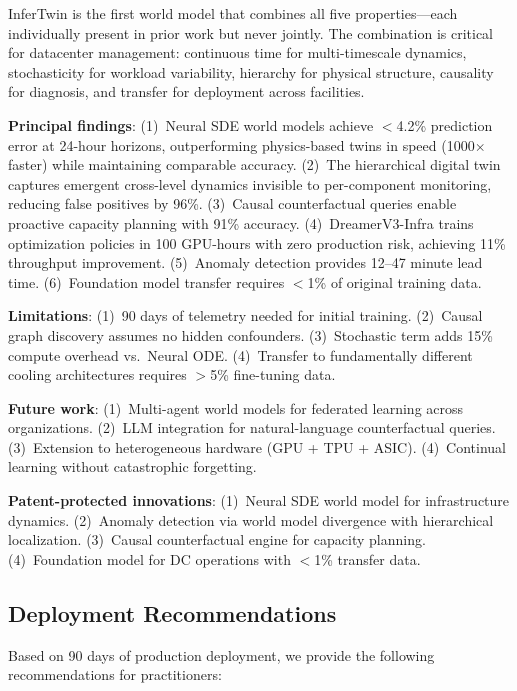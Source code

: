 \documentclass[conference,10pt]{IEEEtran}
\begin{document}
InferTwin is the first world model that combines all five properties---each individually present in prior work but never jointly. The combination is critical for datacenter management: continuous time for multi-timescale dynamics, stochasticity for workload variability, hierarchy for physical structure, causality for diagnosis, and transfer for deployment across facilities.

\textbf{Principal findings}: (1)~Neural SDE world models achieve $<$4.2\% prediction error at 24-hour horizons, outperforming physics-based twins in speed (1000$\times$ faster) while maintaining comparable accuracy. (2)~The hierarchical digital twin captures emergent cross-level dynamics invisible to per-component monitoring, reducing false positives by 96\%. (3)~Causal counterfactual queries enable proactive capacity planning with 91\% accuracy. (4)~DreamerV3-Infra trains optimization policies in 100 GPU-hours with zero production risk, achieving 11\% throughput improvement. (5)~Anomaly detection provides 12--47 minute lead time. (6)~Foundation model transfer requires $<$1\% of original training data.

\textbf{Limitations}: (1)~90 days of telemetry needed for initial training. (2)~Causal graph discovery assumes no hidden confounders. (3)~Stochastic term adds 15\% compute overhead vs.\ Neural ODE. (4)~Transfer to fundamentally different cooling architectures requires $>$5\% fine-tuning data.

\textbf{Future work}: (1)~Multi-agent world models for federated learning across organizations. (2)~LLM integration for natural-language counterfactual queries. (3)~Extension to heterogeneous hardware (GPU + TPU + ASIC). (4)~Continual learning without catastrophic forgetting.

\textbf{Patent-protected innovations}: (1)~Neural SDE world model for infrastructure dynamics. (2)~Anomaly detection via world model divergence with hierarchical localization. (3)~Causal counterfactual engine for capacity planning. (4)~Foundation model for DC operations with $<$1\% transfer data.



\subsection{Deployment Recommendations}

Based on 90 days of production deployment, we provide the following recommendations for practitioners:
\end{document}
